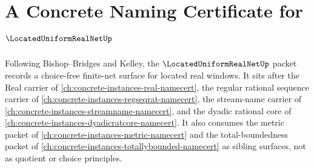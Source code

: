 \chapter{A Concrete Naming Certificate for $\LocatedUniformRealNetUp$}
\label{ch:concrete-instances-located-uniform-real-net-namecert}

Following Bishop--Bridges and Kelley, the $\LocatedUniformRealNetUp$ packet records a choice-free finite-net surface for located real windows. It sits after the Real carrier of \autoref{ch:concrete-instances-real-namecert}, the regular rational sequence carrier of \autoref{ch:concrete-instances-regseqrat-namecert}, the stream-name carrier of \autoref{ch:concrete-instances-streamname-namecert}, and the dyadic rational core of \autoref{ch:concrete-instances-dyadicratcore-namecert}. It also consumes the metric packet of \autoref{ch:concrete-instances-metric-namecert} and the total-boundedness packet of \autoref{ch:concrete-instances-totallybounded-namecert} as sibling surfaces, not as quotient or choice principles.

